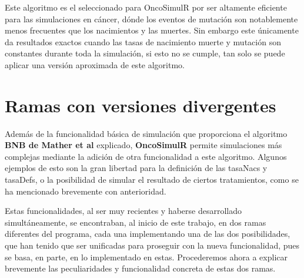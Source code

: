 Este algoritmo es el seleccionado para OncoSimulR por ser altamente eficiente para las simulaciones en cáncer, dónde los eventos de mutación son notablemente menos frecuentes que los nacimientos y las muertes. Sin embargo este únicamente da resultados exactos cuando las tasas de nacimiento muerte y mutación son constantes durante toda la simulación, si esto no se cumple, tan solo se puede aplicar una versión aproximada de este algoritmo. 

\section{Ramas con versiones divergentes}\label{2.2}

Además de la funcionalidad básica de simulación que proporciona el algoritmo \textbf{BNB de Mather et al} explicado, \textbf{OncoSimulR} permite simulaciones más complejas mediante la adición de otra funcionalidad a este algoritmo. Algunos ejemplos de esto son la gran libertad para la definición de las \glspl{tasaNac} y \glspl{tasaDef}, o la posibilidad de simular el resultado de ciertos tratamientos, como se ha mencionado brevemente con anterioridad.

Estas funcionalidades, al ser muy recientes y haberse desarrollado simultáneamente, se encontraban, al inicio de este trabajo, en dos ramas diferentes del programa, cada una implementando una de las dos posibilidades, que han tenido que ser unificadas para proseguir con la nueva funcionalidad, pues se basa, en parte, en lo implementado en estas.
Procederemos ahora a explicar brevemente las peculiaridades y funcionalidad concreta de estas dos ramas.

